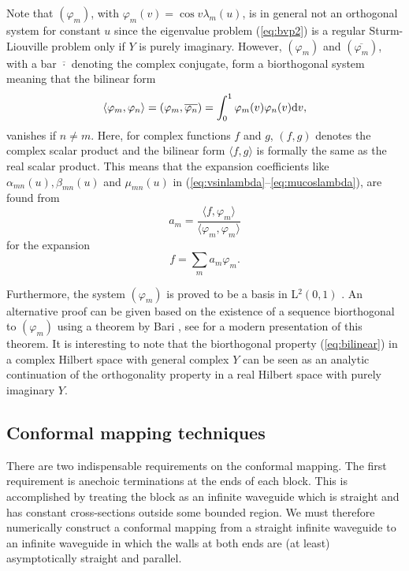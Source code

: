 \documentclass[numreferences]{kluwer}
\begin{document}
Note that $(\varphi_m)$, with $\varphi_m(v)=\cos v\lambda_m(u)$, is in
general not an orthogonal system for constant $u$ since the eigenvalue problem
(\ref{eq:bvp2}) is a regular Sturm-Liouville problem only if $Y$ is
purely imaginary. However, $(\varphi_m)$ and $(\overline{\varphi_m})$,
with a bar $\overline{\cdot}$ denoting the complex conjugate, form a
biorthogonal system meaning that the bilinear form
\begin{equation}\label{eq:bilinear}
  \langle \varphi_m,\varphi_n\rangle
  =(\varphi_m,\overline{\varphi_n})
  =\int_0^1\varphi_m(v)\varphi_n(v){\rm d}v,
\end{equation}
vanishes if $n\neq m$. Here, for complex functions $f$ and $g$,
$(f,g)$ denotes the complex scalar product and the bilinear form
$\langle f,g \rangle$ is formally the same as the real scalar
product. This means that the expansion coefficients like
$\alpha_{mn}(u),\beta_{mn}(u)$ and $\mu_{mn}(u)$ in
(\ref{eq:vsinlambda}--\ref{eq:mucoslambda}), are found from
\begin{equation}\label{eq:am}
 a_m=\frac{\langle f,\varphi_m \rangle}{\langle \varphi_m,\varphi_m \rangle}
\end{equation}
for the expansion
\begin{equation}\label{eq:expansion}
  f=\sum_m a_m \varphi_m.
\end{equation}

Furthermore, the system $(\varphi_m)$ is proved to be a basis in
L$^2(0,1)$ \cite{Schwartz:1954}. An alternative proof can be given
based on the existence of a sequence biorthogonal to $(\varphi_m)$
using a theorem by Bari \cite{Bari:1944}, see \cite{Christensson:2003}
for a modern presentation of this theorem. It is interesting to note
that the biorthogonal property (\ref{eq:bilinear}) in a complex
Hilbert space with general complex $Y$ can be seen as an analytic
continuation of the orthogonality property in a real Hilbert space
with purely imaginary $Y$.

\subsection{Conformal mapping techniques}
\label{sec:confmap}

There are two indispensable requirements on the conformal
mapping. The first requirement is anechoic terminations at the ends of each block. This is
accomplished by treating the block as an infinite waveguide which is
straight and has constant cross-sections outside some bounded
region. We must therefore numerically construct a conformal mapping
from a straight infinite waveguide to an infinite waveguide in which the
walls at both ends are (at least) asymptotically straight and
parallel.
\end{document}
